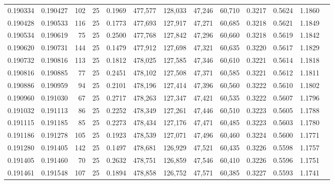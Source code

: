 \begin{tabular}{rrrrrrrrrrrrr}
0.190334 & 0.190427 &   102 &  25 &                                     0.1969 & 477,577 & 128,033 &  47,246 &  60,710 & 0.3217 & 0.5624 & 1.1860 \\
0.190428 & 0.190533 &   116 &  25 &                                     0.1773 & 477,693 & 127,917 &  47,271 &  60,685 & 0.3218 & 0.5621 & 1.1849 \\
0.190534 & 0.190619 &    75 &  25 &                                     0.2500 & 477,768 & 127,842 &  47,296 &  60,660 & 0.3218 & 0.5619 & 1.1842 \\
0.190620 & 0.190731 &   144 &  25 &                                     0.1479 & 477,912 & 127,698 &  47,321 &  60,635 & 0.3220 & 0.5617 & 1.1829 \\
0.190732 & 0.190816 &   113 &  25 &                                     0.1812 & 478,025 & 127,585 &  47,346 &  60,610 & 0.3221 & 0.5614 & 1.1818 \\
0.190816 & 0.190885 &    77 &  25 &                                     0.2451 & 478,102 & 127,508 &  47,371 &  60,585 & 0.3221 & 0.5612 & 1.1811 \\
0.190886 & 0.190959 &    94 &  25 &                                     0.2101 & 478,196 & 127,414 &  47,396 &  60,560 & 0.3222 & 0.5610 & 1.1802 \\
0.190960 & 0.191030 &    67 &  25 &                                     0.2717 & 478,263 & 127,347 &  47,421 &  60,535 & 0.3222 & 0.5607 & 1.1796 \\
0.191032 & 0.191113 &    86 &  25 &                                     0.2252 & 478,349 & 127,261 &  47,446 &  60,510 & 0.3223 & 0.5605 & 1.1788 \\
0.191115 & 0.191185 &    85 &  25 &                                     0.2273 & 478,434 & 127,176 &  47,471 &  60,485 & 0.3223 & 0.5603 & 1.1780 \\
0.191186 & 0.191278 &   105 &  25 &                                     0.1923 & 478,539 & 127,071 &  47,496 &  60,460 & 0.3224 & 0.5600 & 1.1771 \\
0.191280 & 0.191405 &   142 &  25 &                                     0.1497 & 478,681 & 126,929 &  47,521 &  60,435 & 0.3226 & 0.5598 & 1.1757 \\
0.191405 & 0.191460 &    70 &  25 &                                     0.2632 & 478,751 & 126,859 &  47,546 &  60,410 & 0.3226 & 0.5596 & 1.1751 \\
0.191461 & 0.191548 &   107 &  25 &                                     0.1894 & 478,858 & 126,752 &  47,571 &  60,385 & 0.3227 & 0.5593 & 1.1741 \\

\end{tabular}
